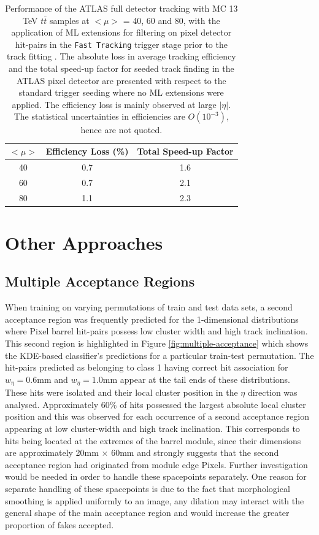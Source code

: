 \begin{table}[!htbp]
\caption{Performance of the ATLAS full detector tracking with MC 13 TeV $t\bar{t}$ samples at $<\mu>$ = 40, 60 and 80, with the application of ML extensions for filtering on pixel detector hit-pairs in the \texttt{Fast Tracking} trigger stage prior to the track fitting \cite{public-hlt}. The absolute loss in average tracking efficiency and the total speed-up factor for seeded track finding in the ATLAS pixel detector are presented with respect to the standard trigger seeding where no ML extensions were applied. The efficiency loss is mainly observed at large $|\eta|$. The statistical uncertainties in efficiencies are $O(10^{-3})$, hence are not quoted.}
\begin{center}
\begin{tabular}{ccc}
\toprule
$<\mu>$ & Efficiency Loss (\%) & Total Speed-up Factor  \\
\hline
40 & 0.7 & 1.6 \\
60 & 0.7 & 2.1 \\
80 & 1.1 & 2.3 \\
\bottomrule
\end{tabular}
\end{center}
\label{tab:pileup}
\end{table}


\section{Other Approaches}
\subsection{Multiple Acceptance Regions}

When training on varying permutations of train and test data sets, a second acceptance region was frequently predicted for the 1-dimensional distributions where Pixel barrel hit-pairs possess low cluster width and high track inclination. This second region is highlighted in Figure \ref{fig:multiple-acceptance} which shows the KDE-based classifier's predictions for a particular train-test permutation. The hit-pairs predicted as belonging to class 1 having correct hit association for $w_{\eta} = 0.6$mm and $w_{\eta} = 1.0$mm appear at the tail ends of these distributions. These hits were isolated and their local cluster position in the $\eta$ direction was analysed. Approximately 60\% of hits possessed the largest absolute local cluster position and this was observed for each occurrence of a second acceptance region appearing at low cluster-width and high track inclination. This corresponds to hits being located at the extremes of the barrel module, since their dimensions are approximately 20mm $\times$ 60mm \cite{pixel-module-dimensions} and strongly suggests that the second acceptance region had originated from module edge Pixels. Further investigation would be needed in order to handle these spacepoints separately. One reason for separate handling of these spacepoints is due to the fact that morphological smoothing is applied uniformly to an image, any dilation may interact with the general shape of the main acceptance region and would increase the greater proportion of fakes accepted.

